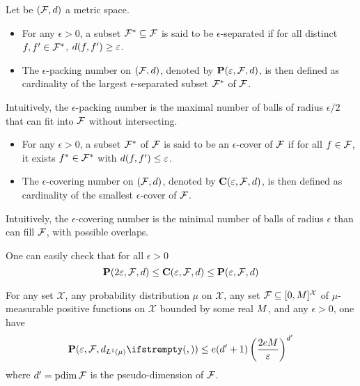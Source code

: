 	\begin{tcolorbox}
		\begin{definition}
			Let be $(\mathcal{F}, d)$ a metric space. 
			\begin{itemize}
				\item For any $\epsilon> 0$, a subset $\mathcal{F}^* \subseteq \mathcal{F}$ is said to be $\epsilon$-separated if for all distinct $f, f' \in \mathcal{F}^*$, $d(f, f') \geq \varepsilon$.
				\item The $\epsilon$-packing number on $(\mathcal{F}, d)$, denoted by $\mathbf{P}(\varepsilon, \mathcal{F}, d)$, is then defined as cardinality of the largest $\epsilon$-separated subset $\mathcal{F}^*$ of $\mathcal{F}$.
			\end{itemize}
			Intuitively, the $\epsilon$-packing number is the maximal number of balls of radius $\epsilon/2$ that can fit into $\mathcal{F}$ without intersecting.
			\begin{itemize}
				\item For any $\epsilon> 0$, a subset $\mathcal{F}^*$ of $\mathcal{F}$ is said to be an $\epsilon$-cover of $\mathcal{F}$ if for all $f \in \mathcal{F}$, it exists $f^* \in \mathcal{F}^*$ with $d(f, f') \leq \varepsilon$.
				\item The $\epsilon$-covering number on $(\mathcal{F}, d)$, denoted by $\mathbf{C}(\varepsilon, \mathcal{F}, d)$, is then defined as cardinality of the smallest $\epsilon$-cover of $\mathcal{F}$.
			\end{itemize}
			Intuitively, the $\epsilon$-covering number is the minimal number of balls of radius $\epsilon$ than can fill $\mathcal{F}$, with possible overlaps.
		\end{definition}
	
		One can easily check that for all $\epsilon>0$
		\begin{equation}
			\mathbf{P}(2\varepsilon, \mathcal{F}, d) \leq \mathbf{C}(\varepsilon, \mathcal{F}, d) \leq \mathbf{P}(\varepsilon, \mathcal{F}, d)
		\end{equation}
	\end{tcolorbox}
	
	
	
	
	
	\begin{tcolorbox}
		\begin{theorem}
			\label{thm_pack}
			For any set $\mathcal{X}$, any probability distribution $\mu$ on $\mathcal{X}$, any
			set $\mathcal{F} \subseteq [0,M]^{\mathcal{X}}$ of $\mu$-measurable positive functions on $\mathcal{X}$ bounded by some real $M$, and any $\epsilon>0$, one have
			\begin{equation}
				\packing(\epsilon, \queryset, \dlone{\mu}{}{}) \le e(\pdim+1) \left(\frac{2e \bound}{\epsilon}\right)^\pdim
			\end{equation}
			where ${d^{\prime}}=\operatorname{pdim}\mathcal{F}$ is the pseudo-dimension of $\mathcal{F}$.
		\end{theorem}
	\end{tcolorbox}





